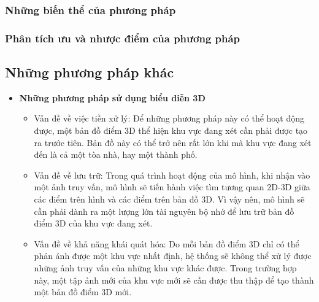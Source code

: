 \subsubsection*{Những biến thể của phương pháp}
\subsubsection*{Phân tích ưu và nhược điểm của phương pháp}

\subsection{Những phương pháp khác}

\begin{itemize}
    \item \textbf{Những phương pháp sử dụng biểu diễn 3D}
    \begin{itemize}
        \item Vấn đề về việc tiền xử lý: Để những phương pháp này có thể hoạt động được, một bản đồ điểm 3D thể hiện khu vực đang xét cần phải được tạo ra trước tiên. Bản đồ này có thể trở nên rất lớn khi mà khu vực đang xét đến là cả một tòa nhà, hay một thành phố.
        \item Vấn đề về lưu trữ: Trong quá trình hoạt động của mô hình, khi nhận vào một ảnh truy vấn, mô hình sẽ tiến hành việc tìm tương quan 2D-3D giữa các điểm trên hình và các điểm trên bản đồ 3D. Vì vậy nên, mô hình sẽ cần phải dành ra một lượng lớn tài nguyên bộ nhớ để lưu trữ bản đồ điểm 3D của khu vực đang xét.
        \item Vấn đề về khả năng khái quát hóa: Do mỗi bản đồ điểm 3D chỉ có thể phản ánh được một khu vực nhất định, hệ thống sẽ không thể xử lý được những ảnh truy vấn của những khu vực khác được. Trong trường hợp này, một tập ảnh mới của khu vực mới sẽ cần được thu thập để tạo thành một bản đồ điểm 3D mới.
    \end{itemize}


\end{itemize}
